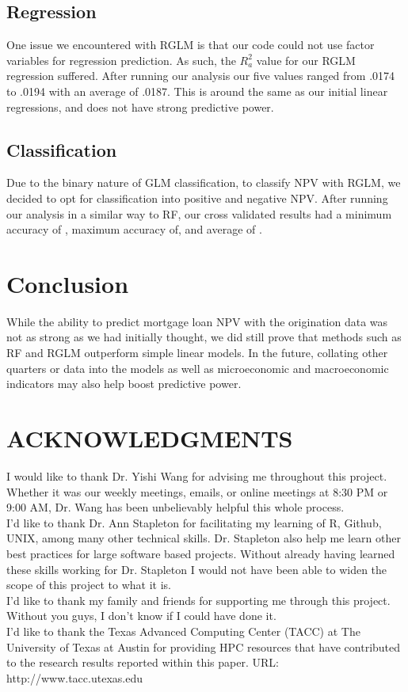 \documentclass[12 pt]{uncw_thesis}
\theoremstyle{plain}
\theoremstyle{remark}
\theoremstyle{definition}
\begin{document}
\subsection{Regression}
One issue we encountered with RGLM is that our code could not use factor variables for regression prediction. As such, the \(R_a^2\) value for our RGLM regression suffered. After running our analysis our five values ranged from .0174 to .0194 with an average of .0187. This is around the same as our initial linear regressions, and does not have strong predictive power.
\subsection{Classification}
Due to the binary nature of GLM classification, to classify NPV with RGLM, we decided to opt for classification into positive and negative NPV. After running our analysis in a similar way to RF, our cross validated results had a minimum accuracy of , maximum accuracy of, and average of . 
\section{Conclusion}
While the ability to predict mortgage loan NPV with the origination data was not as strong as we had initially thought, we did still prove that methods such as RF and RGLM outperform simple linear models. In the future, collating other quarters or data into the models as well as microeconomic and macroeconomic indicators may also help boost predictive power. 

\newpage
\section*{ACKNOWLEDGMENTS}
I would like to thank Dr. Yishi Wang for advising me throughout this project. Whether it was our weekly meetings, emails, or online meetings at 8:30 PM or 9:00 AM, Dr. Wang has been unbelievably helpful this whole process. \\
\linebreak
I'd like to thank Dr. Ann  Stapleton for facilitating my learning of R,  Github, UNIX, among many other technical skills. Dr. Stapleton also help me learn other best practices for large software based projects. Without already having learned these skills working for Dr. Stapleton I would not have been able to widen the scope of this project to what it is.\\
\linebreak 
I'd like to thank my family and friends for supporting me through this project. Without you guys, I don't know if I could have done it.\\
\linebreak
I'd like to thank the Texas Advanced Computing Center (TACC) at The University of Texas at Austin for providing HPC resources that have contributed to the research results reported within this paper. URL: http://www.tacc.utexas.edu
%
\end{document}
